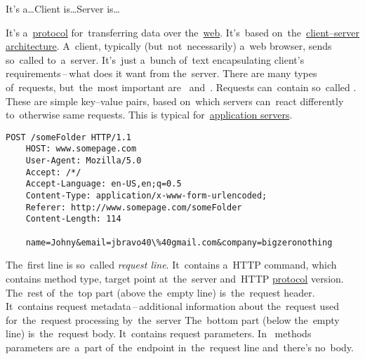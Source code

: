 \label{clientserverarchitecture}
\newline\todo It's a\dots Client is\dots Server is\dots

\label{tcpip}

\label{networkprotocols}

\label{tcp}

\label{ip}

\label{http}
It's a~\hyperref[protocolstandard]{protocol} for~transferring data over the~\hyperref[internetweb]{web}.
It's~based on~the~\hyperref[clientserverarchitecture]{client--server architecture}.
A~client, typically (but~not~necessarily) a~web browser, sends so~called  to~a~server.
It's~just a~bunch of~text encapsulating client's requirements\,--\,what does it want from the~server.
There are many types of~requests, but~the~most important are~ and~.
Requests can~contain so~called .
These are simple key--value pairs, based on~which servers can~react differently to~otherwise same requests.
This is typical for~\hyperref[applicationserver]{application servers}.

\begin{lstlisting}[title={Example of a~HTTP \textit{POST} request, parameters are~visible at~the~bottom}]
    POST /someFolder HTTP/1.1
    HOST: www.somepage.com
    User-Agent: Mozilla/5.0
    Accept: /*/
    Accept-Language: en-US,en;q=0.5
    Content-Type: application/x-www-form-urlencoded;
    Referer: http://www.somepage.com/someFolder
    Content-Length: 114

    name=Johny&email=jbravo40\%40gmail.com&company=bigzeronothing
\end{lstlisting}

\noindent The~first line is so~called \textit{request line}.
It~contains a~HTTP command, which contains method type, target point at~the~server and~HTTP \hyperref[protocolstandard]{protocol} version.
The~rest of~the~top part (above the~empty line) is~the~request header.
It~contains request metadata\,--\,additional information about the~request used for~the~request processing by~the~server
The~bottom part (below the~empty line) is~the~request body.
It~contains request parameters.
In~ methods parameters are~a~part of~the~endpoint in~the~request line and~there's no~body.

